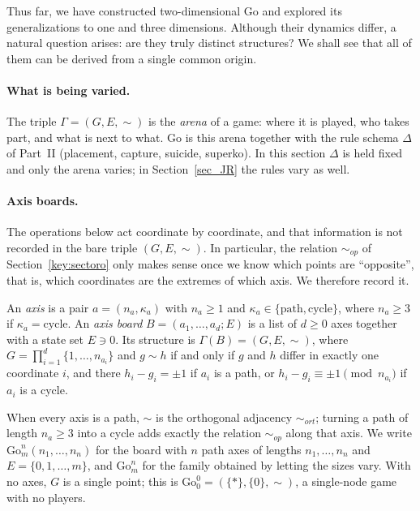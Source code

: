Thus far, we have constructed two-dimensional Go and explored its generalizations to one and three dimensions. Although their dynamics differ, a natural question arises: are they truly distinct structures? We shall see that all of them can be derived from a single common origin.

\paragraph{What is being varied.} The triple $\Gamma=(G,E,\sim)$ is the \emph{arena} of a game: where it is played, who takes part, and what is next to what. Go is this arena together with the rule schema $\Delta$ of Part~II (placement, capture, suicide, superko). In this section $\Delta$ is held fixed and only the arena varies; in Section~\ref{sec_JR} the rules vary as well.

\paragraph{Axis boards.} The operations below act coordinate by coordinate, and that information is not recorded in the bare triple $(G,E,\sim)$. In particular, the relation $\sim_{op}$ of Section~\ref{key:sectoro} only makes sense once we know which points are ``opposite'', that is, which coordinates are the extremes of which axis. We therefore record it.

\begin{definition}
	An \emph{axis} is a pair $a=(n_a,\kappa_a)$ with $n_a\ge 1$ and $\kappa_a\in\{\mathrm{path},\mathrm{cycle}\}$, where $n_a\ge 3$ if $\kappa_a=\mathrm{cycle}$. An \emph{axis board} $B=(a_1,\dots,a_d;E)$ is a list of $d\ge 0$ axes together with a state set $E\ni 0$. Its structure is $\Gamma(B)=(G,E,\sim)$, where $G=\prod_{i=1}^{d}\{1,\dots,n_{a_i}\}$ and $g\sim h$ if and only if $g$ and $h$ differ in exactly one coordinate $i$, and there $h_i-g_i=\pm1$ if $a_i$ is a path, or $h_i-g_i\equiv\pm1 \pmod{n_{a_i}}$ if $a_i$ is a cycle.
\end{definition}

When every axis is a path, $\sim$ is the orthogonal adjacency $\sim_{ort}$; turning a path of length $n_a\ge3$ into a cycle adds exactly the relation $\sim_{op}$ along that axis. We write $\mathrm{Go}^n_m(n_1,\dots,n_n)$ for the board with $n$ path axes of lengths $n_1,\dots,n_n$ and $E=\{0,1,\dots,m\}$, and $\mathrm{Go}^n_m$ for the family obtained by letting the sizes vary. With no axes, $G$ is a single point; this is $\mathrm{Go}^0_0=(\{\ast\},\{0\},\sim)$, a single-node game with no players.

